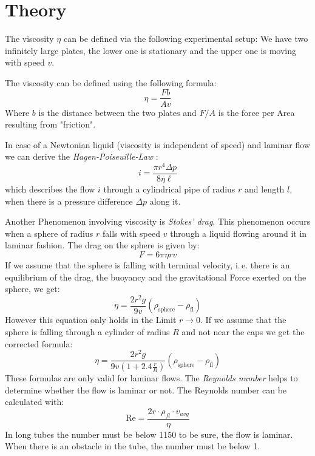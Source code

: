 \section{Theory}

The viscosity $\eta$ can be defined via the following experimental setup: We have two infinitely large plates, the lower one is stationary and the upper one is moving with speed $v$.

The viscosity can be defined using the following formula:
\begin{equation}
    \eta = \frac{F b}{A v} \label{eq:vis}
\end{equation}
Where $b$ is the distance between the two plates and $F/A$ is the force per Area resulting from "friction".

In case of a Newtonian liquid (viscosity is independent of speed) and laminar flow  we can derive the \emph{Hagen-Poiseuille-Law} :
\begin{equation}
    i = \frac{\pi r^4 \Delta p}{8 \eta \ell} \label{eq:hp}
\end{equation}
which describes the flow $i$ through a cylindrical pipe of radius $r$ and length $l$, when there is a pressure difference $\Delta p$ along it.

Another Phenomenon involving viscosity is \emph{Stokes' drag}. This phenomenon occurs when a sphere of radius $r$ falls with speed $v$ through a liquid flowing around it in laminar fashion. The drag on the sphere is given by:
\begin{equation}
    F = 6 \pi \eta r v \label{eq:stokes}
\end{equation}
If we assume that the sphere is falling with terminal velocity, i.\,e. there is an equilibrium of the drag, the buoyancy and the gravitational Force exerted on the sphere, we get:
\begin{equation}
    \eta = \frac{2 r^2 g}{9 v}(\rho_\mathrm{sphere} - \rho_\mathrm{fl}) \label{eq:termid}
\end{equation}
However this equation only holds in the Limit $r \to 0$. 
If we assume that the sphere is falling through a cylinder of radius $R$ and not near the caps we get the corrected formula:
\begin{equation}
    \eta = \frac{2 r^2 g}{9 v \left( 1 + 2.4 \frac{r}{R} \right)}(\rho_\mathrm{sphere} - \rho_\mathrm{fl}) \label{eq:term}
\end{equation}
These formulas are only valid for laminar flows. The \emph{Reynolds number} helps to determine whether the flow is laminar or not. The Reynolds number can be calculated with:
\begin{equation}
\text{Re} = \frac{2r\cdot \rho_ {fl} \cdot v_{avg}}{\eta}
\label{eq:reynold}
\end{equation}
In long tubes the number must be below 1150 to be sure, the flow is laminar. When there is an obstacle in the tube, the number must be below 1.




